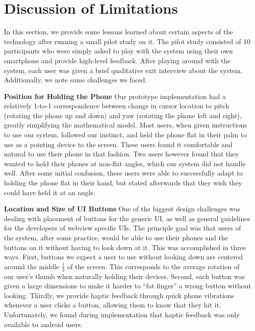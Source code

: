 \section{Discussion of Limitations}

In this section, we provide some lessons learned about certain
aspects of the technology after running a small pilot study on
it. The pilot study consisted of 10 participants who were simply
asked to play with the system using their own smartphone and
provide high-level feedback. After playing around with the system,
each user was given a brief qualitative exit interview about the
system. Additionally, we note some challenges we faced.

\textbf{Position for Holding the Phone} Our prototype implementation had a relatively 1-to-1
correspondence between change in cursor location to pitch (rotating
the phone up and down) and yaw (rotating the phone left and right),
greatly simplifying the mathematical model. Most users, when given
instructions to use our system, followed our instinct, and held the
phone flat in their palm to use as a pointing device to the screen.
These users found it comfortable and natural to use their phone in
that fashion. Two users however found that they wanted to hold
their phones at non-flat angles, which our system did not handle well.
After some initial confusion, these users were able to successfully
adapt to holding the phone flat in their hand, but stated afterwards
that they wish they could have held it at an angle.

\textbf{Location and Size of UI Buttons} One of the biggest design challenges was dealing with placement of
buttons for the generic UI, as well as general guidelines for the
developers of webview specific UIs. The principle goal was that
users of the system, after some practice, would be able to use
their phones and the buttons on it without having to look down
at it. This was accomplished in three ways. First, buttons we expect a
user to use without looking down are centered around the middle
$\frac{1}{3}$ of the screen. This corresponds to the average rotation
of our user's thumb when naturally holding their devices. Second,
each button was given a large dimensions to make it harder to ``fat
finger'' a wrong button without looking. Thirdly, we provide haptic
feedback through quick phone vibrations whenever a user clicks a
button, allowing them to know that they hit it. Unfortunately, we
found during implementation that haptic feedback was only available
to android users.


